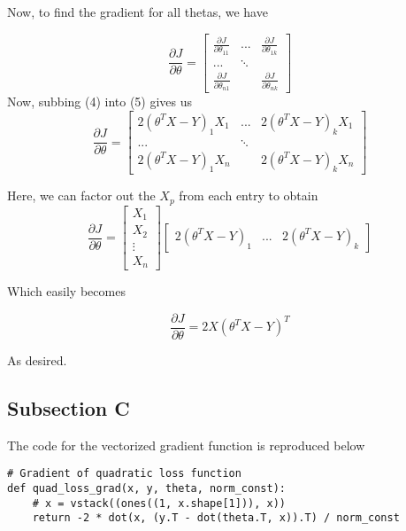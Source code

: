 \documentclass[11pt,a4paper]{report}
\begin{document}
Now, to find the gradient for all thetas, we have

\begin{equation}
\frac{\partial J}{\partial \theta} = 
\begin{bmatrix}
\frac{\partial J}{\partial \theta_{11}} & ... & \frac{\partial J}{\partial \theta_{1k}}\\
... &  \ddots \\
\frac{\partial J}{\partial \theta_{n1}} & & \frac{\partial J}{\partial \theta_{nk}}
\end{bmatrix}
\end{equation}
Now, subbing (4) into (5) gives us
\begin{equation}
\frac{\partial J}{\partial \theta} = 
\begin{bmatrix}
2(\theta^TX-Y)_1X_1 & ... & 2(\theta^TX-Y)_kX_1\\
... &  \ddots \\
2(\theta^TX-Y)_1X_n & & 2(\theta^TX-Y)_kX_n
\end{bmatrix}
\end{equation}

Here, we can factor out the $X_p$ from each entry to obtain
\begin{equation}
\frac{\partial J}{\partial \theta} = 
\begin{bmatrix}
X_1 \\
X_2 \\
\vdots\\
X_n	
\end{bmatrix}
\begin{bmatrix}
2(\theta^TX-Y)_1 & ... & 2(\theta^TX-Y)_k
\end{bmatrix}
\end{equation}

Which easily becomes

\begin{equation}
\frac{\partial J}{\partial \theta} = 2X(\theta^TX-Y)^T
\end{equation}

As desired.
\subsection*{Subsection C}
The code for the vectorized gradient function is reproduced below
\begin{lstlisting}
# Gradient of quadratic loss function
def quad_loss_grad(x, y, theta, norm_const):
    # x = vstack((ones((1, x.shape[1])), x))
    return -2 * dot(x, (y.T - dot(theta.T, x)).T) / norm_const
\end{lstlisting}
\end{document}
